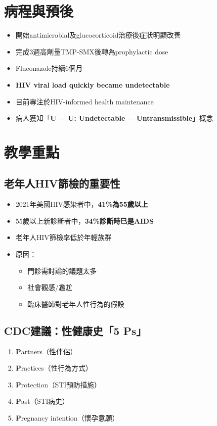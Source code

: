 \documentclass[12pt,a4paper]{article}
\begin{document}
\section{病程與預後}

\begin{itemize}
    \item 開始antimicrobial及glucocorticoid治療後症狀明顯改善
    \item 完成3週高劑量TMP-SMX後轉為prophylactic dose
    \item Fluconazole持續6個月
    \item \textbf{HIV viral load quickly became undetectable}
    \item 目前專注於HIV-informed health maintenance
    \item 病人獲知「\textbf{U = U: Undetectable = Untransmissible}」概念
\end{itemize}

\section{教學重點}

\subsection{老年人HIV篩檢的重要性}

\begin{itemize}
    \item 2021年美國HIV感染者中，\textbf{41\%為55歲以上}
    \item 55歲以上新診斷者中，\textbf{34\%診斷時已是AIDS}
    \item 老年人HIV篩檢率低於年輕族群
    \item 原因：
    \begin{itemize}
        \item 門診需討論的議題太多
        \item 社會觀感/尷尬
        \item 臨床醫師對老年人性行為的假設
    \end{itemize}
\end{itemize}

\subsection{CDC建議：性健康史「5 Ps」}
\begin{enumerate}
    \item \textbf{P}artners（性伴侶）
    \item \textbf{P}ractices（性行為方式）
    \item \textbf{P}rotection（STI預防措施）
    \item \textbf{P}ast（STI病史）
    \item \textbf{P}regnancy intention（懷孕意願）
\end{enumerate}
\end{document}
